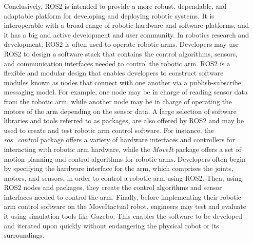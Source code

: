 \documentclass[12pt,oneside]{article}
\begin{document}
Conclusively, ROS2 is intended to provide a more robust, dependable, and adaptable platform for developing and deploying robotic systems. It is interoperable with a broad range of robotic hardware and software platforms, and it has a big and active development and user community.
In robotics research and development, ROS2 is often used to operate robotic arms. Developers may use ROS2 to design a software stack that contains the control algorithms, sensors, and communication interfaces needed to control the robotic arm. ROS2 is a flexible and modular design that enables developers to construct software modules known as nodes that connect with one another via a publish-subscribe messaging model. For example, one node may be in charge of reading sensor data from the robotic arm, while another node may be in charge of operating the motors of the arm depending on the sensor data. A large selection of software libraries and tools referred to as packages, are also offered by ROS2 and may be used to create and test robotic arm control software. For instance, the \textit{ros\_control} package offers a variety of hardware interfaces and controllers for interacting with robotic arm hardware, while the \textit{MoveIt} package offers a set of motion planning and control algorithms for robotic arms. Developers often begin by specifying the hardware interface for the arm, which comprises the joints, motors, and sensors, in order to control a robotic arm using ROS2. Then, using ROS2 nodes and packages, they create the control algorithms and sensor interfaces needed to control the arm. Finally, before implementing their robotic arm control software on the MoveItactual robot, engineers may test and evaluate it using simulation tools like Gazebo. This enables the software to be developed and iterated upon quickly without endangering the physical robot or its surroundings.
\end{document}
